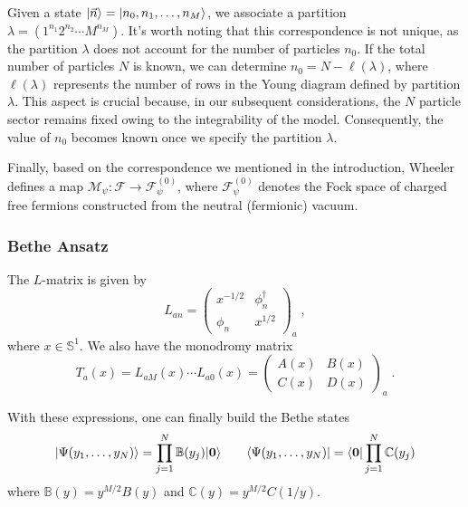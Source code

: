 \documentclass[a4paper,11pt]{amsart}
\begin{document}
Given a state \(\lvert\vec{n}\rangle = \lvert n_0, n_1, \dots, n_M\rangle\), we
associate a partition \( \lambda = (1^{n_1} 2^{n_2} \cdots
M^{n_M})\).  It's worth noting that this correspondence is not unique,
as the partition \(\lambda\) does not account for the number of
particles \(n_0\).  If the total number of particles \(N\) is known,
we can determine \(n_0 = N - \ell(\lambda)\), where \(\ell(\lambda)\)
represents the number of rows in the Young diagram defined by
partition \(\lambda\).  This aspect is crucial because, in our
subsequent considerations, the \(N\) particle sector remains fixed
owing to the integrability of the model. Consequently, the value of
\(n_0\) becomes known once we specify the partition \(\lambda\).

Finally, based on the correspondence we mentioned in the introduction,
Wheeler~\cite{Wheeler:2010vmq} defines a map \(\mathcal{M}_\psi:
\mathcal{F} \to \mathcal{F}^{(0)}_\psi\), where
\(\mathcal{F}^{(0)}_\psi\) denotes the Fock space of charged free
fermions constructed from the neutral (fermionic) vacuum.


\subsubsection{Bethe Ansatz}
The \(L\)-matrix is given by 
\begin{equation}
  L_{an} = 
\begin{pmatrix}
x^{ - 1/2} & \phi_n^\dagger \\ \phi_n & x^{1/2}
\end{pmatrix}_a\; , 
\end{equation}
where \(x \in \mathbb{S}^1\). We also have the monodromy matrix
\begin{equation}
  T_a(x) = L_{aM}(x) \cdots L_{a0}(x) = 
\begin{pmatrix}
A(x) & B(x) \\ C(x) & D(x)
\end{pmatrix}_a\; .
\end{equation}

With these expressions, one can finally build the Bethe states
\begin{equation}
  \lvert\Psi(y_1, \dots, y_N)\rangle = \prod_{j=1}^N \mathbb{B}(y_j) \lvert\bm{0}\rangle \qquad 
  \langle\Psi(y_1, \dots, y_N)\rvert = \langle\bm{0}\rvert\prod_{j=1}^N \mathbb{C}(y_j) 
\end{equation}
where \(\mathbb{B}(y) = y^{M/2} B(y)\) and \(\mathbb{C}(y) = y^{M/2} C(1/y)\).
\end{document}
